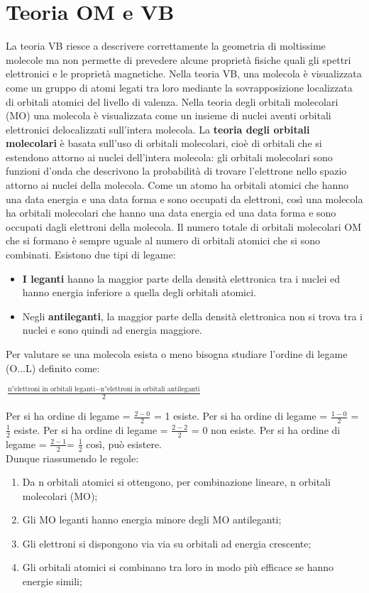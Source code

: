 \documentclass[11pt, a4paper, openright]{book}
\begin{document}
\section{Teoria OM e VB }
La teoria VB riesce a descrivere correttamente la geometria di moltissime molecole ma non permette di prevedere alcune proprietà fisiche quali gli spettri elettronici e le proprietà magnetiche.
Nella teoria VB, una molecola è visualizzata come un gruppo di atomi legati tra loro mediante la sovrapposizione localizzata di orbitali atomici del livello di
valenza. Nella teoria degli orbitali molecolari (MO) una molecola è visualizzata come un insieme di nuclei aventi orbitali elettronici delocalizzati sull'intera molecola.
La \textbf{teoria degli orbitali molecolari} è basata
sull'uso di orbitali molecolari, cioè di orbitali che si
estendono attorno ai nuclei dell'intera molecola: gli orbitali
molecolari sono funzioni d'onda che descrivono la
probabilità di trovare l'elettrone nello spazio attorno ai
nuclei della molecola. Come un atomo ha orbitali atomici che hanno una data energia e una data forma e sono occupati da elettroni, così una molecola ha orbitali molecolari che hanno una data energia ed una data forma e sono occupati dagli elettroni della molecola.
Il numero totale di orbitali molecolari OM che si formano è sempre uguale al numero di orbitali atomici che si sono combinati. Esistono due tipi di legame:
\begin{itemize}
    \item  \textbf{I leganti} hanno la maggior parte della densità elettronica tra i nuclei ed hanno energia inferiore a quella degli orbitali atomici.
    \item Negli \textbf{antileganti}, la maggior parte della densità elettronica non si trova tra i nuclei e sono quindi ad energia maggiore.
\end{itemize}
Per valutare se una molecola esista o meno bisogna studiare l'ordine di legame (O...L) definito come:
\begin{center}
    $\frac{\text{n°elettroni in orbitali leganti}- \text{n°elettroni in orbitali antileganti}}{2}$
\end{center}
Per  si ha ordine di legame = $\frac{2-0}{2}$ = 1 esiste.
Per  si ha ordine di legame = $\frac{1-0}{2}$ = $\frac{1}{2}$ 
esiste.
Per  si ha ordine di legame = $\frac{2-2}{2}$ = 0 non esiste.
Per si ha ordine di legame = $\frac{2-1}{2}$= $\frac{1}{2}$ così, può esistere.
\\
Dunque riassumendo le regole: 
\begin{enumerate}
    \item Da n orbitali atomici si ottengono, per combinazione lineare, n orbitali molecolari (MO);
    \item Gli MO leganti hanno energia minore degli MO antileganti;
    \item Gli elettroni si dispongono via via su orbitali ad energia crescente;
    \item Gli orbitali atomici si combinano tra loro in modo più efficace se hanno energie simili;
\end{enumerate}
\end{document}
